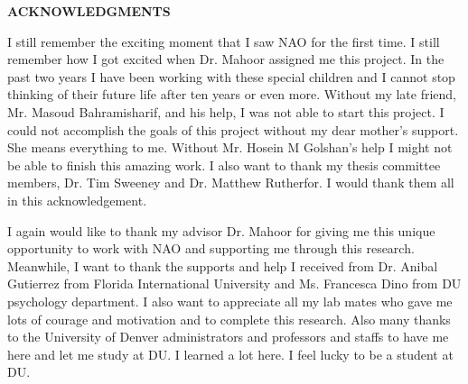\newpage
\begin{center}
{\Large \textbf{ACKNOWLEDGMENTS}}
\end{center}
\vspace{10mm}

I still remember the exciting moment that I saw NAO for the first time. I still
remember how I got excited when Dr. Mahoor assigned me this project. In the past two
years I have been working with these special children and I cannot stop thinking of their
future life after ten years or even more. Without my late friend, Mr. Masoud Bahramisharif,
and his help, I was not able to start this project. I could not accomplish the goals of this
project without my dear mother’s support. She means everything to me. Without 
Mr. Hosein M Golshan’s help I might not be able to finish this amazing work. I also want
to thank my thesis committee members, Dr. Tim Sweeney and Dr. Matthew Rutherfor. 
I would thank them all in this acknowledgement.

\vspace{3mm}

I again would like to thank my advisor Dr. Mahoor for giving me this unique
opportunity to work with NAO and supporting me through this research. Meanwhile, I
want to thank the supports and help I received from Dr. Anibal Gutierrez from Florida
International University and Ms. Francesca Dino from DU psychology
department. I also want to appreciate all my lab mates who gave me lots of courage and
motivation and to complete this research. Also many thanks to the University of Denver
administrators and professors and staffs to have me here and let me study at DU. I learned
a lot here. I feel lucky to be a student at DU.
